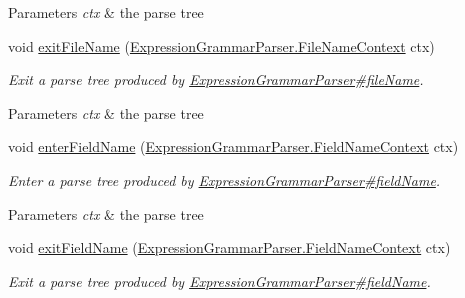 \begin{DoxyCompactItemize}
\begin{DoxyCompactList}
\begin{DoxyParams}{Parameters}
{\em ctx} & the parse tree\\
\hline
\end{DoxyParams}
 \end{DoxyCompactList}\item 
void \hyperlink{classgov_1_1nasa_1_1jpf_1_1inspector_1_1server_1_1expression_1_1parser_1_1_expression_grammar_base_listener_aec9431242e1a40bb6508fd5bd42e06d2}{exit\+File\+Name} (\hyperlink{classgov_1_1nasa_1_1jpf_1_1inspector_1_1server_1_1expression_1_1parser_1_1_expression_grammar_parser_1_1_file_name_context}{Expression\+Grammar\+Parser.\+File\+Name\+Context} ctx)
\begin{DoxyCompactList}\small\item\em Exit a parse tree produced by \hyperlink{classgov_1_1nasa_1_1jpf_1_1inspector_1_1server_1_1expression_1_1parser_1_1_expression_grammar_parser_adf54161babb1708d7e9f4bc2855c4ed0}{Expression\+Grammar\+Parser\#file\+Name}.


\begin{DoxyParams}{Parameters}
{\em ctx} & the parse tree\\
\hline
\end{DoxyParams}
 \end{DoxyCompactList}\item 
void \hyperlink{classgov_1_1nasa_1_1jpf_1_1inspector_1_1server_1_1expression_1_1parser_1_1_expression_grammar_base_listener_a6721c7cfa39e702e7fc735c9a2f7618e}{enter\+Field\+Name} (\hyperlink{classgov_1_1nasa_1_1jpf_1_1inspector_1_1server_1_1expression_1_1parser_1_1_expression_grammar_parser_1_1_field_name_context}{Expression\+Grammar\+Parser.\+Field\+Name\+Context} ctx)
\begin{DoxyCompactList}\small\item\em Enter a parse tree produced by \hyperlink{classgov_1_1nasa_1_1jpf_1_1inspector_1_1server_1_1expression_1_1parser_1_1_expression_grammar_parser_a8a1d62717889eb5e0c4d60b1e68dec92}{Expression\+Grammar\+Parser\#field\+Name}.


\begin{DoxyParams}{Parameters}
{\em ctx} & the parse tree\\
\hline
\end{DoxyParams}
 \end{DoxyCompactList}\item 
void \hyperlink{classgov_1_1nasa_1_1jpf_1_1inspector_1_1server_1_1expression_1_1parser_1_1_expression_grammar_base_listener_ae0193edf8ab9464d51b5e6e1dbc69597}{exit\+Field\+Name} (\hyperlink{classgov_1_1nasa_1_1jpf_1_1inspector_1_1server_1_1expression_1_1parser_1_1_expression_grammar_parser_1_1_field_name_context}{Expression\+Grammar\+Parser.\+Field\+Name\+Context} ctx)
\begin{DoxyCompactList}\small\item\em Exit a parse tree produced by \hyperlink{classgov_1_1nasa_1_1jpf_1_1inspector_1_1server_1_1expression_1_1parser_1_1_expression_grammar_parser_a8a1d62717889eb5e0c4d60b1e68dec92}{Expression\+Grammar\+Parser\#field\+Name}.



\end{DoxyCompactList}
\end{DoxyCompactItemize}
